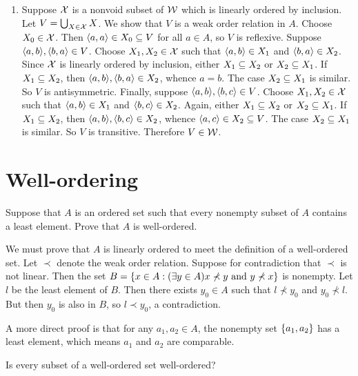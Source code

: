 \begin{solution}
\begin{enumerate}[label=(\alph*)]
    \item Suppose $\mathcal{X}$ is a nonvoid subset of $\mathcal{W}$ which is linearly ordered by inclusion.
    Let $V=\bigcup_{X\in\mathcal{X}} X$. We show that $V$ is a weak order relation in $A$.
    Choose $X_0\in \mathcal{X}$. Then $\left\langle a,a\right\rangle\in X_0\subseteq V$ for all $a\in A$, so $V$ is reflexive.
    Suppose $\aprn{a,b},\aprn{b,a}\in V$. Choose $X_1,X_2\in\mathcal{X}$ such that $\left\langle a,b\right\rangle\in X_1$ and $\left\langle b,a\right\rangle\in X_2$.
    Since $\mathcal{X}$ is linearly ordered by inclusion, either $X_1\subseteq X_2$ or $X_2\subseteq X_1$.
    If $X_1\subseteq X_2$, then $\aprn{a,b},\aprn{b,a}\in X_2$, whence $a=b$. The case $X_2\subseteq X_1$ is similar.
    So $V$ is antisymmetric.
    Finally, suppose $\aprn{a,b},\aprn{b,c}\in V$.
    Choose $X_1,X_2\in\mathcal{X}$ such that $\left\langle a,b\right\rangle\in X_1$ and $\left\langle b,c\right\rangle\in X_2$.
    Again, either $X_1\subseteq X_2$ or $X_2\subseteq X_1$.
    If $X_1\subseteq X_2$, then $\aprn{a,b},\aprn{b,c}\in X_2$, whence $\left\langle a,c\right\rangle\in X_2\subseteq V$.
    The case $X_2\subseteq X_1$ is similar. So $V$ is transitive.
    Therefore $V\in\mathcal{W}$.
\end{enumerate}
\end{solution}


\section{Well-ordering}
\begin{exercise}
Suppose that $A$ is an ordered set such that every nonempty subset of $A$ contains a
least element. Prove that $A$ is well-ordered.
\end{exercise}

\begin{solution}
We must prove that $A$ is linearly ordered to meet the definition of a well-ordered set.
Let $\prec$ denote the weak order relation.
Suppose for contradiction that $\prec$ is not linear.
Then the set $B=\left\{ x\in A : (\exists y\in A)x\nprec y\text{ and } y\nprec x \right\}$ is nonempty.
Let $l$ be the least element of $B$. Then there exists $y_0\in A$ such that $l\nprec y_0$ and $y_0\nprec l$.
But then $y_0$ is also in $B$, so $l\prec y_0$, a contradiction.

A more direct proof is that for any $a_1,a_2\in A$, the nonempty set $\left\{a_1,a_2\right\}$ has a least
element, which means $a_1$ and $a_2$ are comparable.
\end{solution}

\begin{exercise}
Is every subset of a well-ordered set well-ordered?
\end{exercise}

